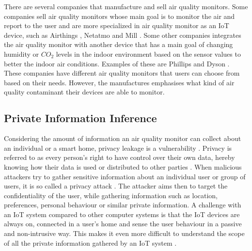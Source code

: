 There are several companies that manufacture and sell air quality monitors. Some companies sell air quality monitors whose main goal is to monitor the air and report to the user and are more specialized in air quality monitor as an \gls{IoT} device, such as Airthings \cite{Airthings}, Netatmo \cite{Netatmo} and Mill \cite{Mill}. Some other companies integrates the air quality monitor with another device that has a main goal of changing humidity or \(CO_2\) levels in the indoor environment based on the sensor values to better the indoor air conditions. Examples of these are Phillips \cite{Philips} and Dyson \cite{Dyson}. These companies have different air quality monitors that users can choose from based on their needs. However, the manufactures emphasises what kind of air quality contaminant their devices are able to monitor. 

\subsection{Private Information Inference}
Considering the amount of information an air quality monitor can collect about an individual or a smart home, privacy leakage is a vulnerability \cite{SecPrivSmartCity}. Privacy is referred to as every person's right to have control over their own data, hereby knowing how their data is used or distributed to other parties \cite{IoTSecPrivSafeEth}. When malicious attackers try to gather sensitive information about an individual user or group of users, it is so called a privacy attack \cite{CyberEntitySecInIoT}. The attacker aims then to target the confidentiality of the user, while gathering information such as location, preferences, personal behaviour or similar private information. A challenge with an \gls{IoT} system compared to other computer systems is that the \gls{IoT} devices are always on, connected in a user's home and sense the user behaviour in a passive and non-intrusive way. This makes it even more difficult to understand the scope of all the private information gathered by an \gls{IoT} system \cite{IoTSecPrivSafeEth}.

